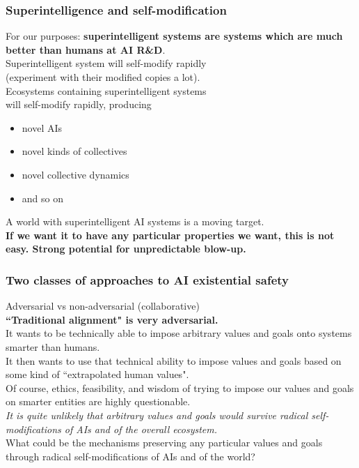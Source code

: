 \documentclass{beamer}
\begin{document}
\begin{frame}

  \frametitle{Superintelligence and self-modification}

For our purposes: {\bf superintelligent systems are systems which are much better than humans at AI R\&D}.\\[2ex]

Superintelligent system will self-modify rapidly\\(experiment with their modified copies a lot).\\[2ex]

Ecosystems containing superintelligent systems\\will self-modify rapidly, producing
\begin{itemize}
  \item novel AIs
  \item novel kinds of collectives
  \item novel collective dynamics
  \item and so on\\[2ex]
\end{itemize} 

A world with superintelligent AI systems is a moving target.\\[2ex]

{\bf If we want it to have any particular properties we want,
this is not easy. Strong potential for unpredictable blow-up.}

\end{frame}

\begin{frame}

  \frametitle{Two classes of approaches to AI existential safety}

Adversarial vs non-adversarial (collaborative)\\[2ex]

{\bf ``Traditional alignment" is very adversarial.}\\[2ex]

It wants to be technically able to impose arbitrary values and goals onto systems smarter than humans.\\[2ex]

It then wants to use that technical ability to impose values and goals based on some kind of
``extrapolated human values".\\[2ex]

Of course, ethics, feasibility, and wisdom of trying to impose our values and goals on smarter entities are highly questionable.\\[2ex]

{\em It is quite unlikely that arbitrary values and goals would survive
radical self-modifications of AIs and of the overall ecosystem.}\\[2ex]

What could be the mechanisms preserving any particular values and goals
through radical self-modifications of AIs and of the world?

\end{frame}
\end{document}
